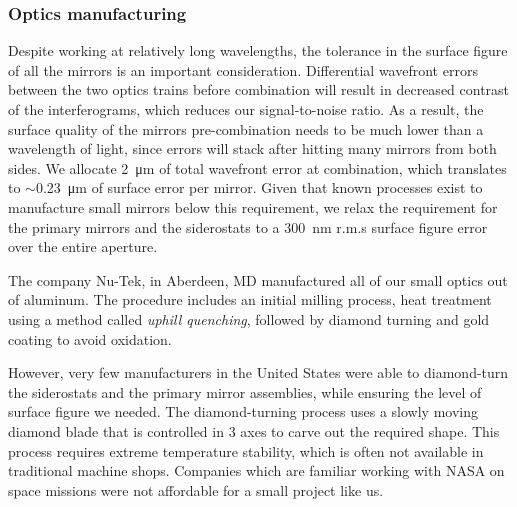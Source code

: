 \subsubsection{Optics manufacturing}

Despite working at relatively long wavelengths, the tolerance in the surface figure of all the mirrors is an important consideration. %
Differential wavefront errors between the two optics trains before combination will result in decreased contrast of the interferograms, which reduces our signal-to-noise ratio. As a result, the surface quality of the mirrors pre-combination needs to be much lower than a wavelength of light, since errors will stack after hitting many mirrors from both sides. We allocate \SI{2}{\um} of total wavefront error at combination, which translates to $\sim$\SI{0.23}{\um} of surface error per mirror. Given that known processes exist to manufacture small mirrors below this requirement, we relax the requirement for the primary mirrors and the siderostats to a \SI{300}{\nano\meter} r.m.s surface figure error over the entire aperture.



The company Nu-Tek, in Aberdeen, MD manufactured all of our small optics out of aluminum. The procedure includes an initial milling process, heat treatment using a method called \textit{uphill quenching}, followed by diamond turning and gold coating to avoid oxidation. 

However, very few manufacturers in the United States were able to diamond-turn the siderostats and the primary mirror assemblies, while ensuring the level of surface figure we needed. The diamond-turning process uses a slowly moving diamond blade that is controlled in 3 axes to carve out the required shape. This process requires extreme temperature stability, which is often not available in traditional machine shops. Companies which are familiar working with NASA on space missions were not affordable for a small project like us.

